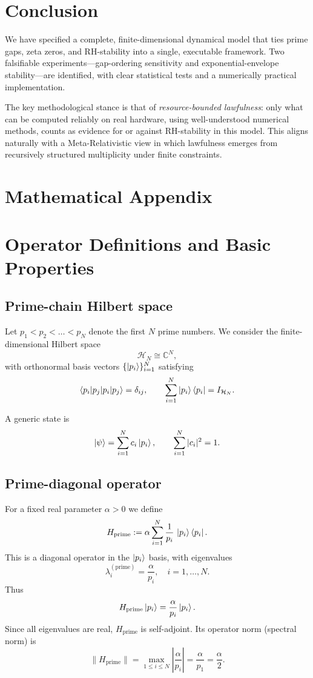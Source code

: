 \documentclass[11pt]{article}
\begin{document}
\section{Conclusion}

We have specified a complete, finite-dimensional dynamical model that ties prime gaps, zeta zeros, and RH-stability into a single, executable framework. Two falsifiable experiments---gap-ordering sensitivity and exponential-envelope stability---are identified, with clear statistical tests and a numerically practical implementation. 

The key methodological stance is that of \emph{resource-bounded lawfulness}: only what can be computed reliably on real hardware, using well-understood numerical methods, counts as evidence for or against RH-stability in this model. This aligns naturally with a Meta-Relativistic view in which lawfulness emerges from recursively structured multiplicity under finite constraints.

\appendix
\section*{Mathematical Appendix}

\section{Operator Definitions and Basic Properties}

\subsection{Prime-chain Hilbert space}

Let $p_1<p_2<\dots<p_N$ denote the first $N$ prime numbers. We consider the finite-dimensional Hilbert space
\[
\mathcal{H}_N \cong \mathbb{C}^N,
\]
with orthonormal basis vectors $\{\ket{p_i}\}_{i=1}^N$ satisfying
\[
\braket{p_i|p_j} = \delta_{ij},\qquad \sum_{i=1}^N \ket{p_i}\bra{p_i} = I_{\mathcal{H}_N}.
\]

A generic state is
\[
\ket{\psi} = \sum_{i=1}^N c_i \ket{p_i},\qquad \sum_{i=1}^N |c_i|^2 = 1.
\]

\subsection{Prime-diagonal operator}

For a fixed real parameter $\alpha>0$ we define
\begin{equation}
H_{\mathrm{prime}} := \alpha \sum_{i=1}^N \frac{1}{p_i}\,\ket{p_i}\bra{p_i}.
\end{equation}
This is a diagonal operator in the $\ket{p_i}$ basis, with eigenvalues
\[
\lambda_i^{(\mathrm{prime})} = \frac{\alpha}{p_i},\quad i=1,\dots,N.
\]
Thus
\[
H_{\mathrm{prime}}\ket{p_i} = \frac{\alpha}{p_i}\ket{p_i}.
\]
Since all eigenvalues are real, $H_{\mathrm{prime}}$ is self-adjoint. Its operator norm (spectral norm) is
\begin{equation}
\|H_{\mathrm{prime}}\| = \max_{1\leq i\leq N} \left|\frac{\alpha}{p_i}\right| = \frac{\alpha}{p_1} = \frac{\alpha}{2}.
\end{equation}
\end{document}
